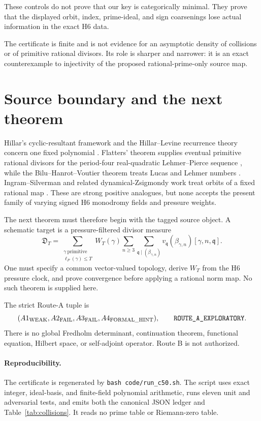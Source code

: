 \documentclass[11pt]{article}
\theoremstyle{definition}\newtheorem{definition}[theorem]{Definition}
\theoremstyle{remark}\newtheorem{remark}[theorem]{Remark}
\begin{document}
These controls do not prove that our key is categorically minimal.  They
prove that the displayed orbit, index, prime-ideal, and sign coarsenings lose
actual information in the exact H6 data.

The certificate is finite and is not evidence for an asymptotic density of
collisions or of primitive rational divisors.  Its role is sharper and
narrower: it is an exact counterexample to injectivity of the proposed
rational-prime-only source map.

\section{Source boundary and the next theorem}

Hillar's cyclic-resultant framework and the Hillar--Levine recurrence theory
concern one fixed polynomial \cite{hillar2005cyclic,hillarlevine2007recurrences}.
Flatters' theorem supplies eventual primitive rational divisors for the
period-four real-quadratic Lehmer--Pierce sequence \cite{flatters2009}, while
the Bilu--Hanrot--Voutier theorem treats Lucas and Lehmer numbers
\cite{bhv2001}.  Ingram--Silverman and related dynamical-Zsigmondy work treat
orbits of a fixed rational map \cite{ingramsilverman2009,silverman2012}.
These are strong positive analogues, but none accepts the present family of
varying signed H6 monodromy fields and pressure weights.

The next theorem must therefore begin with the tagged source object.  A
schematic target is a pressure-filtered divisor measure
\[
\mathfrak D_T
=\sum_{\substack{\gamma\ \mathrm{primitive}\\\ell_P(\gamma)\le T}}
W_T(\gamma)
\sum_{n\ge3}\sum_{\mathfrak q\mid(\beta_{\gamma,n})}
v_{\mathfrak q}(\beta_{\gamma,n})[\gamma,n,\mathfrak q].
\]
One must specify a common vector-valued topology, derive $W_T$ from the H6
pressure clock, and prove convergence before applying a rational norm map.
No such theorem is supplied here.

The strict Route-A tuple is
\[
(A1_{\rm WEAK},A2_{\rm FAIL},A3_{\rm FAIL},A4_{\rm FORMAL\_HINT}),
\qquad \texttt{ROUTE\_A\_EXPLORATORY}.
\]
There is no global Fredholm determinant, continuation theorem, functional
equation, Hilbert space, or self-adjoint operator.  Route B is not
authorized.

\paragraph{Reproducibility.}
The certificate is regenerated by
\texttt{bash code/run\_c50.sh}.  The script uses exact integer, ideal-basis,
and finite-field polynomial arithmetic, runs eleven unit and adversarial
tests, and emits both the canonical JSON ledger and
Table~\ref{tab:collisions}.  It reads no prime table or Riemann-zero table.
\end{document}

